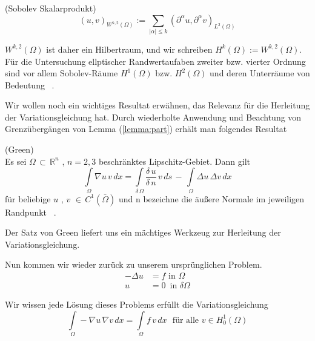 \begin{Definition} (Sobolev Skalarprodukt) \\
\begin{equation*}
(u,v)_{{W^{{k,2}}(\Omega )}}:=\sum _{{|\alpha |\leq k}}(\partial ^{\alpha }u,\partial ^{\alpha }v)_{{L^{2}(\Omega )}}
\end{equation*}
\end{Definition}

$W^{{k,2}}(\Omega )$ ist daher ein Hilbertraum, und wir schreiben $H^{k}(\Omega ):=W^{{k,2}}(\Omega )$.
Für die Untersuchung ellptischer Randwertaufaben zweiter bzw. vierter Ordnung sind vor allem Sobolev-Räume $H^1(\Omega)$ bzw. $H^2(\Omega)$ und deren Unterräume von Bedeutung ~\cite[134]{Numerik}. 

Wir wollen noch ein wichtiges Resultat erwähnen, das Relevanz für die Herleitung der Variationsgleichung hat.
Durch wiederholte Anwendung und Beachtung von Grenzübergängen von Lemma (\ref{lemma:part}) erhält man folgendes Resultat

\begin{Satz} (Green) \\
Es sei $\Omega \, \subset \, \mathbb{R}^{n}$ , $n=2,3$ beschränktes Lipschitz-Gebiet. Dann gilt
\begin{equation*}
\int\limits_{\Omega} \nabla u \, v \, dx = \int\limits_{\delta \, \Omega} \dfrac{\delta \, u}{\delta \, n} \, v \, ds \, - \,
\int\limits_{\Omega} \Delta u \, \Delta v \, dx
\end{equation*}
für beliebige $u$ , $v$ $\in \, C^1(\bar{\Omega})$ und n bezeichne die äußere Normale im jeweiligen Randpunkt ~\cite[140]{Numerik}.
\end{Satz}
Der Satz von Green liefert uns ein mächtiges Werkzeug zur Herleitung der Variationsgleichung.

Nun kommen wir wieder zurück zu unserem ursprünglichen Problem.
\begin{equation*} 
\begin{aligned}
	- \Delta u &= f \text{ in } \Omega \\
	u &= 0 \, \text{ in } \delta \Omega	
\end{aligned}
\end{equation*}

Wir wissen jede Lösung dieses Problems erfüllt die Variationsgleichung
\begin{equation}  \label{eq:vary}
\int\limits_{\Omega} - \nabla u \, \nabla v \, dx = \int\limits_{\Omega} f \, v \, dx \, \, \text{ für alle } v \in H^1_0(\Omega)
\end{equation}


